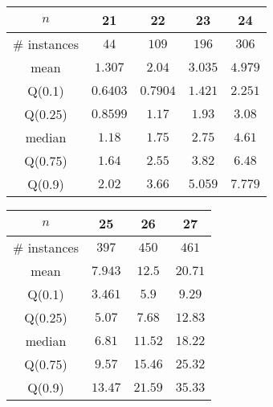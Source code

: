 \begin{tabular}{c|cccc} 
\hline 
$n$ & 21 & 22 & 23 & 24 \tabularnewline 
\hline 
\hline 
\# instances & $44$ & $109$ & $196$ & $306$ \tabularnewline 
mean & $1.307$ & $2.04$ & $3.035$ & $4.979$ \tabularnewline 
Q(0.1) & $0.6403$ & $0.7904$ & $1.421$ & $2.251$ \tabularnewline 
Q(0.25) & $0.8599$ & $1.17$ & $1.93$ & $3.08$ \tabularnewline 
median & $1.18$ & $1.75$ & $2.75$ & $4.61$ \tabularnewline 
Q(0.75) & $1.64$ & $2.55$ & $3.82$ & $6.48$ \tabularnewline 
Q(0.9) & $2.02$ & $3.66$ & $5.059$ & $7.779$ \tabularnewline 
\hline 
\end{tabular} 
\medskip{} 

\begin{tabular}{c|ccc} 
\hline 
$n$ & 25 & 26 & 27 \tabularnewline 
\hline 
\hline 
\# instances & $397$ & $450$ & $461$ \tabularnewline 
mean & $7.943$ & $12.5$ & $20.71$ \tabularnewline 
Q(0.1) & $3.461$ & $5.9$ & $9.29$ \tabularnewline 
Q(0.25) & $5.07$ & $7.68$ & $12.83$ \tabularnewline 
median & $6.81$ & $11.52$ & $18.22$ \tabularnewline 
Q(0.75) & $9.57$ & $15.46$ & $25.32$ \tabularnewline 
Q(0.9) & $13.47$ & $21.59$ & $35.33$ \tabularnewline 
\hline 
\end{tabular} 
\medskip{} 

